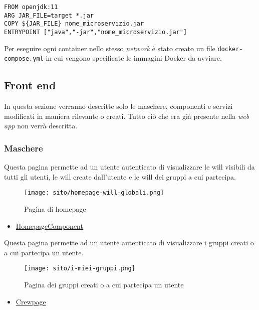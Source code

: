 \begin{lstlisting}[style=Docker]
FROM openjdk:11
ARG JAR_FILE=target *.jar
COPY ${JAR_FILE} nome_microservizio.jar
ENTRYPOINT ["java","-jar","nome_microservizio.jar"]
\end{lstlisting}


Per eseguire ogni \gls{container} nello stesso \textit{network} è stato creato un file \texttt{docker-compose.yml} in cui vengono specificate le immagini Docker da avviare. 
\subsection{Front end}
In questa sezione verranno descritte solo le maschere, componenti e servizi modificati in maniera rilevante o creati. Tutto ciò che era già presente nella \textit{web app} non verrà descritta.
\subsubsection{Maschere}
Questa pagina permette ad un utente autenticato di visualizzare le \gls{will} visibili da tutti gli utenti, le \gls{will} create dall'utente e le \gls{will} dei gruppi a cui partecipa.
\begin{figure}[H] 
    \centering 
    \texttt{[image: sito/homepage-will-globali.png]} 
    \caption{Pagina di homepage}
\end{figure}
\begin{itemize}
    \item \hyperref[par:HomepageComponent]{HomepageComponent}
\end{itemize}

\label{par:Gruppi dell'utente}
Questa pagina permette ad un utente autenticato di visualizzare i gruppi creati o a cui partecipa un utente. 
\begin{figure}[H] 
    \centering 
    \texttt{[image: sito/i-miei-gruppi.png]} 
    \caption{Pagina dei gruppi creati o a cui partecipa un utente}
\end{figure}
\begin{itemize}
    \item \hyperref[par:Crewpage]{Crewpage}
\end{itemize}



